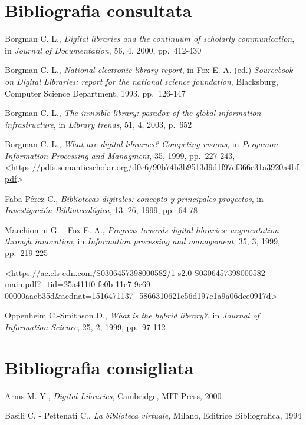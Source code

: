 \documentclass[
  b5paper,
  twoside,
  11pt,
  chapterprefix=false,
  bibliography=totocnumbered,
  parskip=0]{scrbook}
\begin{document}
\hypertarget{bibliografia-consultata-3}{%
\section*{Bibliografia consultata}\label{bibliografia-consultata-3}}

Borgman C. L., \emph{Digital libraries and the continuum of scholarly
communication}, in \emph{Journal of Documentation}, 56, 4, 2000, pp.~412-430

Borgman C. L., \emph{National electronic library report}, in Fox E. A. (ed.)
\emph{Sourcebook on Digital Libraries: report for the national science
foundation}, Blacksburg, Computer Science Department, 1993, pp.~126-147

Borgman C. L., \emph{The invisible library: paradox of the global information
infrastructure}, in \emph{Library trends}, 51, 4, 2003, p.~652

Borgman C. L., \emph{What are digital libraries? Competing visions}, in
\emph{Pergamon. Information Processing and Managment}, 35, 1999, pp.~227-243,
\textless{}{\url{https://pdfs.semanticscholar.org/d0e6/90b74b3b9513d9d1f97cf366e31a3920a4bf.pdf}\textgreater{}}

Faba Pérez C., \emph{Bibliotecas digitales: concepto y principales
proyectos}, in \emph{Investigación Bibliotecológica}, 13, 26, 1999, pp.~64-78

Marchionini G. - Fox E. A., \emph{Progress towards digital libraries:
augmentation through innovation}, in \emph{Information processing and
management}, 35, 3, 1999, pp.~219-225

\textless{}{\url{https://ac.els-cdn.com/S0306457398000582/1-s2.0-S0306457398000582-main.pdf?_tid=25a411f0-fe0b-11e7-9e69-00000aacb35d\&acdnat=1516471137_5866310621e56d197c1a9a06dce0917d}\textgreater{}}

Oppenheim C.-Smithson D., \emph{What is the hybrid library?}, in \emph{Journal of
Information Science}, 25, 2, 1999, pp.~97-112

\hypertarget{bibliografia-consigliata-1}{%
\section*{Bibliografia consigliata}\label{bibliografia-consigliata-1}}

Arms M. Y., \emph{Digital Libraries}, Cambridge, MIT Press, 2000

Basili C. - Pettenati C., \emph{La biblioteca virtuale}, Milano, Editrice
Bibliografica, 1994
\end{document}
